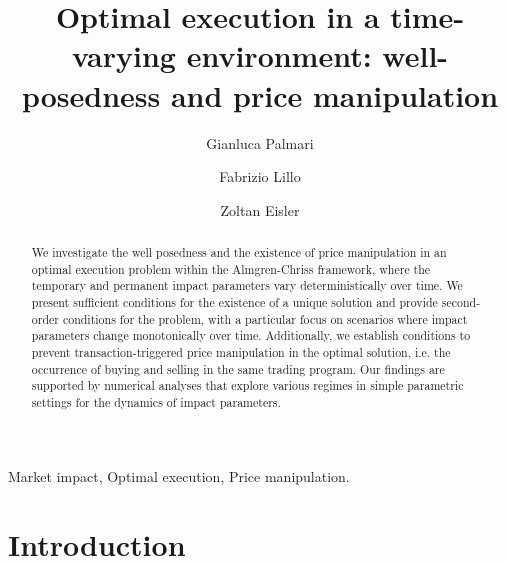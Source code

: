 \documentclass[final,3p,authoryear,12pt]{elsarticle}
\begin{document}
\begin{frontmatter}

\title{Optimal execution in a time-varying environment: well-posedness and price manipulation}

\author[sns]{Gianluca Palmari}

\author[bologna,sns]{Fabrizio Lillo}

\author[imperial]{Zoltan Eisler}

\address[sns]{Classe di Scienze, Scuola Normale Superiore, Piazza dei Cavalieri 7, 56126 Pisa, Italy}
\address[bologna]{Department of Mathematics, University of Bologna, Piazza di Porta San Donato 5, Bologna 40126, Italy}
\address[imperial]{Department of Mathematics, Imperial College London, 180 Queen's Gate, South Kensington, London SW7 2RH, UK}

\begin{abstract}
We investigate the well posedness and the existence of price manipulation in an optimal execution problem within the Almgren-Chriss framework, where the temporary and permanent impact parameters vary deterministically over time. We present sufficient conditions for the existence of a unique solution and provide second-order conditions for the problem, with a particular focus on scenarios where impact parameters change monotonically over time. Additionally, we establish conditions to prevent transaction-triggered price manipulation in the optimal solution, i.e. the occurrence of buying and selling in the same trading program. Our findings are supported by numerical analyses that explore various regimes in simple parametric settings for the dynamics of impact parameters.
\end{abstract}

\begin{keyword}
Market impact, Optimal execution, Price manipulation.
\end{keyword}

\end{frontmatter}




\section{Introduction}\label{sec:Introduction}
\end{document}
